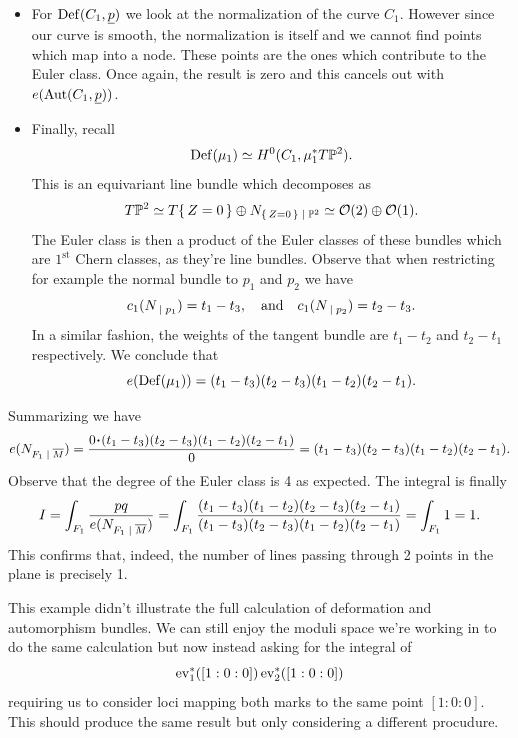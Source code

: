 \documentclass[12pt]{memoir}
\begin{document}
\begin{Ex}
\begin{itemize}
    \item For $\operatorname{Def}(C_1,\underline p)$ we look at the normalization of the curve $C_1$. However since our curve is smooth, the normalization is itself and we cannot find points which map into a node. These points are the ones which contribute to the Euler class. Once again, the result is zero and this cancels out with $e(\operatorname{Aut}(C_1,\underline p))$.
    \item Finally, recall 
    $$\operatorname{Def}(\mu_1)\simeq  H^0(C_1,\mu_1^\ast T\mathbb{P}^2).$$
    This is an equivariant line bundle which decomposes as 
    $$T\bP^2\isom T\set{Z=0}\oplus N_{\set{Z=0}\mid\bP^2}\isom\cO(2)\oplus\cO(1).$$
    The Euler class is then a product of the Euler classes of these bundles which are $1^{\text{st}}$ Chern classes, as they're line bundles. Observe that when restricting for example the normal bundle to $p_1$ and $p_2$ we have 
    $$c_1(N_{\mid p_1})=t_1-t_3,\word{and}c_1(N_{\mid p_2})=t_2-t_3.$$
    In a similar fashion, the weights of the tangent bundle are $t_1-t_2$ and $t_2-t_1$ respectively. We conclude that 
    $$e(\operatorname{Def}(\mu_1))=(t_1-t_3)(t_2-t_3)(t_1-t_2)(t_2-t_1).$$
\end{itemize}
Summarizing we have 
$$e(N_{F_1\mid\ov M})=\frac{0\.(t_1-t_3)(t_2-t_3)(t_1-t_2)(t_2-t_1)}{0}=(t_1-t_3)(t_2-t_3)(t_1-t_2)(t_2-t_1).$$
Observe that the degree of the Euler class is 4 as expected.
The integral is finally 
$$I=\int_{F_1}\frac{pq}{e(N_{F_1\mid\ov M})}=\int_{F_1}\frac{(t_1-t_3)(t_1-t_2)(t_2-t_3)(t_2-t_1)}{(t_1-t_3)(t_2-t_3)(t_1-t_2)(t_2-t_1)}=\int_{F_1}1=1.$$
This confirms that, indeed, the number of lines passing through 2 points in the plane is precisely 1.
\end{Ex} 

This example didn't illustrate the full calculation of deformation and automorphism bundles. We can still enjoy the moduli space we're working in to do the same calculation but now instead asking for the integral of 
$$\operatorname{ev}_1^\ast([1:0:0])\operatorname{ev}_2^\ast([1:0:0])$$
requiring us to consider loci mapping both marks to the same point $[1:0:0]$. This should produce the same result but only considering a different procudure.
\end{document}
